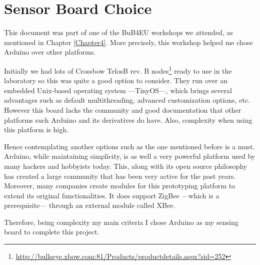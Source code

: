 
\chapter{Sensor Board Choice} %

\label{AppendixB} %


This document was part of one of the BuB4EU workshops we attended, as mentioned in Chapter \ref{Chapter4}. More precisely, this workshop helped me chose Arduino over other platforms.

Initially we had lots of Crossbow TelosB rev. B nodes\footnote{\url{http://bullseye.xbow.com:81/Products/productdetails.aspx?sid=252}} ready to use in the laboratory so this was quite a good option to consider. They run over an embedded Unix-based operating system ---TinyOS---, which brings several advantages such as default multithreading, advanced customization options, etc. However this board lacks the community and good documentation that other platforms such Arduino and its derivatives do have. Also, complexity when using this platform is high.  

Hence contemplating another options such as the one mentioned before is a must. Arduino, while maintaining simplicity, is as well a very powerful platform used by many hackers and hobbyists today. This, along with its open source philosophy has created a large community that has been very active for the past years. Moreover, many companies create modules for this prototyping platform to extend its original functionalities. It does support ZigBee ---which is a prerequisite--- through an external module called XBee.

Therefore, being complexity my main criteria I chose Arduino as my sensing board to complete this project.
